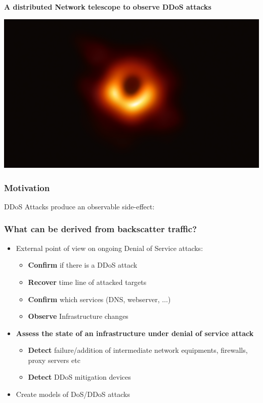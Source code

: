 \documentclass{beamer}
\begin{document}
\begin{frame}
        \frametitle{}
        \begin{center}
         {\bf A distributed Network telescope to observe DDoS attacks}
        \end{center}
        \vspace{10pt}
        \begin{center}
          \includegraphics[width=.7\textwidth]{eventhorizon.png}
        \end{center}
\end{frame}

\begin{frame}
        \frametitle{Motivation}
        DDoS Attacks produce an observable side-effect:
        \begin{center}
          \scalebox{0.8}{}
        \end{center}
\end{frame}

\begin{frame}
\frametitle{What can be derived from backscatter traffic?}

\begin{itemize}
    \item External point of view on ongoing Denial of Service attacks:
\begin{itemize}
    \item {\bf Confirm} if there is a DDoS attack
    \item {\bf Recover} time line of attacked targets
    \item {\bf Confirm} which services (DNS, webserver, $\dots$)
    \item {\bf Observe} Infrastructure changes
\end{itemize}
    \item {\bf Assess the state of an infrastructure under denial of service attack}
    \begin{itemize}
        \item {\bf Detect} failure/addition of  intermediate network equipments, firewalls, proxy servers etc
        \item {\bf Detect} DDoS mitigation devices
    \end{itemize}
    \item Create models of DoS/DDoS attacks
\end{itemize}
\end{frame}
\end{document}
